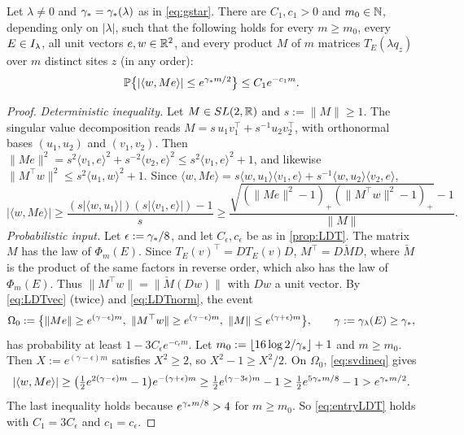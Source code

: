 \begin{lemma}\label{lem:entry}
Let $\lambda\ne0$ and $\gamma_*=\gamma_*(\lambda)$ as in \eqref{eq:gstar}.  There are $C_1,c_1>0$ and
$m_0\in\mathbb{N}$, depending only on $|\lambda|$, such that the following holds for every $m\ge m_0$, every
$E\in I_\lambda$, all unit vectors $e,w\in\mathbb{R}^2$, and every product $M$ of $m$ matrices $T_E(\lambda q_z)$
over $m$ distinct sites $z$ (in any order):
\begin{equation}\label{eq:entryLDT}
  \mathbb{P}\bigl\{|\langle w,Me\rangle|\le e^{\gamma_* m/2}\bigr\}\le C_1e^{-c_1m}.
\end{equation}
\end{lemma}

\begin{proof}
\emph{Deterministic inequality.}  Let $M\in SL(2,\mathbb{R})$ and $s:=\|M\|\ge1$.  The singular value
decomposition reads $M=s\,u_1v_1^\top+s^{-1}u_2v_2^\top$, with orthonormal bases $(u_1,u_2)$ and $(v_1,v_2)$.
Then $\|Me\|^2=s^2\langle v_1,e\rangle^2+s^{-2}\langle v_2,e\rangle^2\le s^2\langle v_1,e\rangle^2+1$, and
likewise $\|M^\top w\|^2\le s^2\langle u_1,w\rangle^2+1$.  Since
$\langle w,Me\rangle=s\langle w,u_1\rangle\langle v_1,e\rangle+s^{-1}\langle w,u_2\rangle\langle v_2,e\rangle$,
\begin{equation}\label{eq:svdineq}
  |\langle w,Me\rangle|\ge\frac{(s|\langle w,u_1\rangle|)(s|\langle v_1,e\rangle|)-1}{s}
  \ge\frac{\sqrt{(\|Me\|^2-1)_+(\|M^\top w\|^2-1)_+}-1}{\|M\|} .
\end{equation}
\emph{Probabilistic input.}  Let $\epsilon:=\gamma_*/8$, and let $C_\epsilon,c_\epsilon$ be as in \cref{prop:LDT}.
The matrix $M$ has the law of $\Phi_m(E)$.  Since $T_E(v)^\top=DT_E(v)D$, $M^\top=D\check MD$, where
$\check M$ is the product of the same factors in reverse order, which also has the law of $\Phi_m(E)$.
Thus $\|M^\top w\|=\|\check M(Dw)\|$ with $Dw$ a unit vector.  By \eqref{eq:LDTvec} (twice) and
\eqref{eq:LDTnorm}, the event
\[
  \Omega_0:=\bigl\{\|Me\|\ge e^{(\gamma-\epsilon)m},\ \|M^\top w\|\ge e^{(\gamma-\epsilon)m},\ \|M\|\le e^{(\gamma+\epsilon)m}\bigr\},
  \qquad\gamma:=\gamma_\lambda(E)\ge\gstar,
\]
has probability at least $1-3C_\epsilon e^{-c_\epsilon m}$.  Let
$m_0:=\lfloor16\log2/\gamma_*\rfloor+1$ and $m\ge m_0$.  Then $X:=e^{(\gamma-\epsilon)m}$ satisfies
$X^2\ge2$, so $X^2-1\ge X^2/2$.  On $\Omega_0$, \eqref{eq:svdineq} gives
\[
  |\langle w,Me\rangle|\ge\bigl(\tfrac12e^{2(\gamma-\epsilon)m}-1\bigr)e^{-(\gamma+\epsilon)m}
  \ge\tfrac12e^{(\gamma-3\epsilon)m}-1\ge\tfrac12e^{5\gamma_* m/8}-1>e^{\gamma_* m/2}.
\]
The last inequality holds because $e^{\gamma_* m/8}>4$ for $m\ge m_0$.  So \eqref{eq:entryLDT} holds
with $C_1=3C_\epsilon$ and $c_1=c_\epsilon$.
\end{proof}

